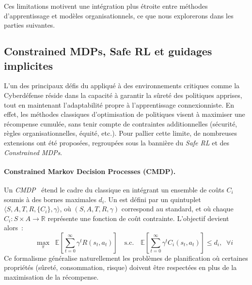 Ces limitations motivent une intégration plus étroite entre méthodes d'apprentissage et modèles organisationnels, ce que nous explorerons dans les parties suivantes.



\subsection{Constrained MDPs, Safe RL et guidages implicites}

\noindent
L'un des principaux défis du  appliqué à des environnements critiques
comme la Cyberdéfense réside dans la capacité à garantir la sûreté des politiques apprises,
tout en maintenant l'adaptabilité propre à l'apprentissage connexionniste.
En effet, les méthodes classiques d'optimisation de politiques visent à maximiser une récompense cumulée,
sans tenir compte de contraintes additionnelles (sécurité, règles organisationnelles, équité, etc.).
Pour pallier cette limite, de nombreuses extensions ont été proposées, regroupées sous la bannière
du \textit{Safe RL} et des \textit{Constrained MDPs}.

\paragraph{Constrained Markov Decision Processes (CMDP).}
Un \textit{CMDP}~\cite{altman1999constrained} étend le cadre du  classique en intégrant
un ensemble de coûts $C_i$ soumis à des bornes maximales $d_i$.
Un  est défini par un quintuplet
$\langle S, A, T, R, \{C_i\}, \gamma \rangle$,
où $(S,A,T,R,\gamma)$ correspond au  standard, et où
chaque $C_i : S \times A \rightarrow \mathbb{R}$ représente une fonction de coût contrainte.
L'objectif devient alors~:
\[
  \hspace{1cm}\max_{\pi} \;\; \mathbb{E}\!\left[\sum_{t=0}^\infty \gamma^t R(s_t,a_t)\right]
  \quad \text{s.c.} \quad
  \mathbb{E}\!\left[\sum_{t=0}^\infty \gamma^t C_i(s_t,a_t)\right] \leq d_i, \;\; \forall i
\]
Ce formalisme généralise naturellement les problèmes de planification où certaines propriétés
(sûreté, consommation, risque) doivent être respectées en plus de la maximisation de la récompense.

